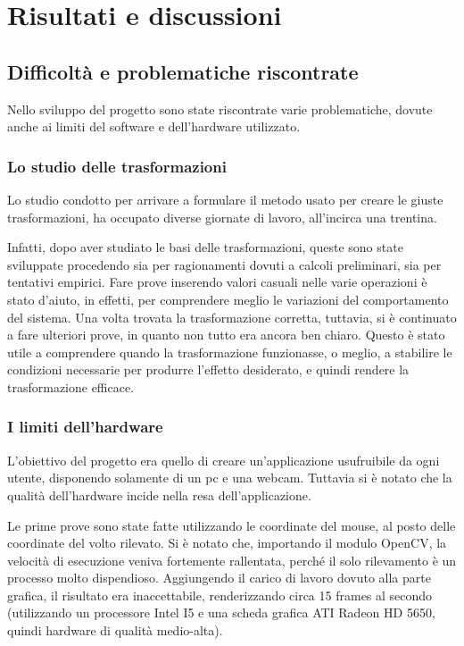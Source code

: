 
\chapter{Risultati e discussioni}

\section{Difficoltà e problematiche riscontrate}

Nello sviluppo del progetto sono state riscontrate varie problematiche, dovute anche ai limiti del software e dell'hardware utilizzato.


\subsection{Lo studio delle trasformazioni}
Lo studio condotto per arrivare a formulare il metodo usato per creare le giuste trasformazioni, ha occupato diverse giornate di lavoro, all'incirca una trentina.

Infatti, dopo aver studiato le basi delle trasformazioni, queste sono state sviluppate procedendo sia per ragionamenti dovuti a calcoli preliminari, sia per tentativi empirici. Fare prove inserendo valori casuali nelle varie operazioni è stato d'aiuto, in effetti, per comprendere meglio le variazioni del comportamento del sistema. Una volta trovata la trasformazione corretta, tuttavia, si è continuato a fare ulteriori prove, in quanto non tutto era ancora ben chiaro. Questo è stato utile a comprendere quando la trasformazione funzionasse, o meglio, a stabilire le condizioni necessarie per produrre l'effetto desiderato, e quindi rendere la trasformazione efficace.


\subsection{I limiti dell'hardware}
L'obiettivo del progetto era quello di creare un'applicazione usufruibile da ogni utente, disponendo solamente di un pc e una webcam. Tuttavia si è notato che la qualità dell'hardware incide nella resa dell'applicazione.

Le prime prove sono state fatte utilizzando le coordinate del mouse, al posto delle coordinate del volto rilevato. Si è notato che, importando il modulo OpenCV, la velocità di esecuzione veniva fortemente rallentata, perché il solo rilevamento è un processo molto dispendioso. Aggiungendo il carico di lavoro dovuto alla parte grafica, il risultato era inaccettabile, renderizzando circa 15 frames al secondo (utilizzando un processore Intel I5 e una scheda grafica ATI Radeon HD 5650, quindi hardware di qualità medio-alta).

